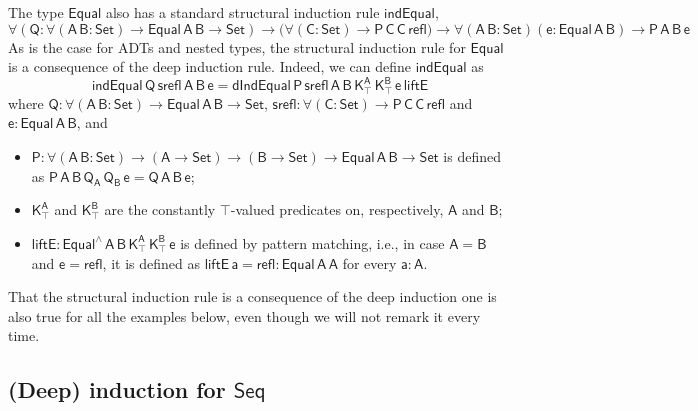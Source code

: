 \documentclass[9pt]{entcs}
\begin{document}
The type $\mathsf{Equal}$ also has a standard structural induction rule $\mathsf{indEqual}$,
\[
\mathsf{\forall (Q : \forall (A\,B : Set) \to Equal\,A\,B \to Set)
  \to \big( \forall (C : Set) \to P\,C\,C\,refl \big)
  \to \forall (A\,B : Set) (e: Equal\,A\,B) \to P\,A\,B\,e}
\]
As is the case for ADTs and nested types,
the structural induction rule for $\mathsf{Equal}$ is a consequence of the deep induction rule.
Indeed, we can define $\mathsf{indEqual}$ as
\[
\mathsf{indEqual\,Q\,srefl\,A\,B\,e = dIndEqual\,P\,srefl\,A\,B\,K^A_\top\,K^B_\top\,e\,liftE}
\]
where
$\mathsf{Q : \forall (A\,B : Set) \to Equal\,A\,B \to Set}$,
$\mathsf{srefl: \forall (C : Set) \to P\,C\,C\,refl}$
and $\mathsf{e : Equal\,A\,B}$, and
\begin{itemize}
\item $\mathsf{P : \forall (A\,B : Set) \to (A \to Set) \to (B \to Set) \to Equal\,A\,B \to Set}$ is defined as
$\mathsf{P\,A\,B\,Q_A\,Q_B\,e = Q\,A\,B\,e}$;
\item $\mathsf{K^A_\top}$ and $\mathsf{K^B_\top}$ are the constantly $\mathsf{\top}$-valued predicates on, respectively, $\mathsf{A}$ and $\mathsf{B}$;
\item $\mathsf{liftE : Equal^{\wedge}\,A\,B\,K^A_\top\,K^B_\top\,e}$ is defined by pattern matching,
i.e., in case $\mathsf{A = B}$ and $\mathsf{e = refl}$,
it is defined as $\mathsf{liftE\,a = refl : Equal\,A\,A}$ for every $\mathsf{a : A}$.
\end{itemize}
That the structural induction rule is a consequence of the deep induction one is also true for all the examples below,
even though we will not remark it every time.



\subsection{(Deep) induction for $\mathsf{Seq}$}
\end{document}
